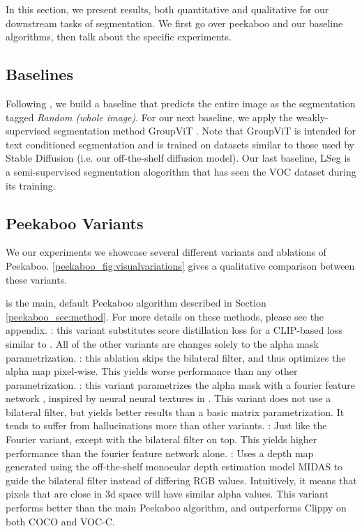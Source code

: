 \label{peekaboo_sec:experiments}
In this section, we present results, both quantitative and qualitative for our downstream tasks of segmentation. We first go over peekaboo and our baseline algorithms, then talk about the specific experiments.

\subsection{Baselines}
	Following \cite{hu2016segmentation}, we build a baseline that predicts the entire image as the segmentation tagged \textit{Random (whole image)}. For our next baseline, we apply the weakly-supervised segmentation method GroupViT \cite{Xu2022GroupViTSS}. Note that GroupViT is intended for text conditioned segmentation and is trained on datasets similar to those used by Stable Diffusion (i.e. our off-the-shelf diffusion model). Our last baseline, LSeg \cite{li2018referring} is a semi-supervised segmentation alogorithm that has seen the VOC dataset during its training. 


\subsection{Peekaboo Variants}
	We our experiments we showcase several different variants and ablations of Peekaboo.  \cref{peekaboo_fig:visualvariations} gives a qualitative comparison between these variants.
 
     is the main, default Peekaboo algorithm described in Section \ref{peekaboo_sec:method}. For more details on these methods, please see the appendix.
	: this variant substitutes score distillation loss for a CLIP-based \cite{clip} loss similar to \cite{jain2021dreamfields}. 
	All of the other variants are changes solely to the alpha mask parametrization.
	: this ablation skips the bilateral filter, and thus optimizes the alpha map pixel-wise. This yields worse performance than any other parametrization.
	: this variant parametrizes the alpha mask with a fourier feature network \cite{ffn}, inspired by neural neural textures in \cite{Burgert2022}. This variant does not use a bilateral filter, but yields better results than a basic matrix parametrization. It tends to suffer from hallucinations more than other variants.
	: Just like the Fourier variant, except with the bilateral filter on top. This yields higher performance than the fourier feature network alone.
	: Uses a depth map generated using the off-the-shelf monocular depth estimation model MIDAS \cite{midas} to guide the bilateral filter instead of differing RGB values. Intuitively, it means that pixels that are close in 3d space will have similar alpha values. This variant performs better than the main Peekaboo algorithm, and outperforms Clippy  \cite{Ranasinghe2022PerceptualGI} on both COCO and VOC-C. 

